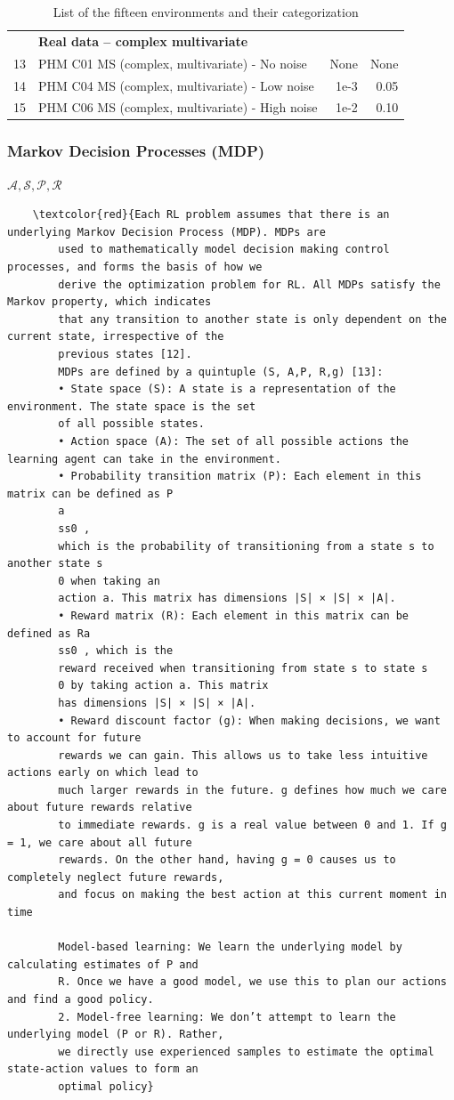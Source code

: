 \documentclass[a4paper, 12pt]{article}
\begin{document}
\begin{table}
\begin{tabular}{@{}r l rr@{}}
		\rule{0pt}{1.5\normalbaselineskip}
		& \multicolumn{3}{l}{\textbf{Real data -- complex multivariate}}\\
		13 & PHM C01 MS (complex, multivariate) - No noise & None & None \\
		14 & PHM C04 MS (complex, multivariate) - Low noise & 1e-3 & 0.05 \\
		15 & PHM C06 MS (complex, multivariate) - High noise & 1e-2 & 0.10 \\ \bottomrule
	\end{tabular}
	\caption{List of the fifteen environments and their categorization}
	\label{tbl:ListEnvironments}
\end{table}

\subsubsection{Markov Decision Processes (MDP)}
$\mathcal{A, S, P, R}$
\begin{verbatim}
	\textcolor{red}{Each RL problem assumes that there is an underlying Markov Decision Process (MDP). MDPs are
		used to mathematically model decision making control processes, and forms the basis of how we
		derive the optimization problem for RL. All MDPs satisfy the Markov property, which indicates
		that any transition to another state is only dependent on the current state, irrespective of the
		previous states [12].
		MDPs are defined by a quintuple (S, A,P, R,g) [13]:
		• State space (S): A state is a representation of the environment. The state space is the set
		of all possible states.
		• Action space (A): The set of all possible actions the learning agent can take in the environment.
		• Probability transition matrix (P): Each element in this matrix can be defined as P
		a
		ss0 ,
		which is the probability of transitioning from a state s to another state s
		0 when taking an
		action a. This matrix has dimensions |S| × |S| × |A|.
		• Reward matrix (R): Each element in this matrix can be defined as Ra
		ss0 , which is the
		reward received when transitioning from state s to state s
		0 by taking action a. This matrix
		has dimensions |S| × |S| × |A|.
		• Reward discount factor (g): When making decisions, we want to account for future
		rewards we can gain. This allows us to take less intuitive actions early on which lead to
		much larger rewards in the future. g defines how much we care about future rewards relative
		to immediate rewards. g is a real value between 0 and 1. If g = 1, we care about all future
		rewards. On the other hand, having g = 0 causes us to completely neglect future rewards,
		and focus on making the best action at this current moment in time
		
		Model-based learning: We learn the underlying model by calculating estimates of P and
		R. Once we have a good model, we use this to plan our actions and find a good policy.
		2. Model-free learning: We don’t attempt to learn the underlying model (P or R). Rather,
		we directly use experienced samples to estimate the optimal state-action values to form an
		optimal policy}
\end{verbatim}
\end{document}

